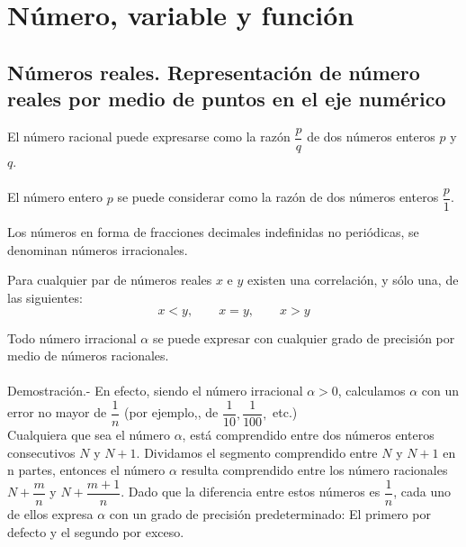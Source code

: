 \chapter{Número, variable y función}

\section{Números reales. Representación de número reales por medio de puntos en el eje numérico}

    \begin{tcolorbox}[colframe=white]
	\begin{def.}
	    El número racional puede expresarse como la razón $\dfrac{p}{q}$ de dos números enteros $p$ y $q$.\\\\
	    El número entero $p$ se puede considerar como la razón de dos números enteros $\dfrac{p}{1}$.\\
	\end{def.}
    \end{tcolorbox}
       
    \begin{tcolorbox}[colframe = white]
	\begin{def.}
	    Los números en forma de fracciones decimales indefinidas no periódicas, se denominan números irracionales.\\
	\end{def.}
    \end{tcolorbox}

    \begin{tcolorbox}[colframe=white]
	\begin{def.}
	    Para cualquier par de números reales $x$ e $y$ existen una correlación, y sólo una, de las siguientes:
	    $$x<y, \qquad x=y, \qquad x>y$$
	\end{def.}
    \end{tcolorbox}

	\begin{teo}
	    Todo número irracional $\alpha$ se puede expresar con cualquier grado de precisión por medio de números racionales.\\\\
	    Demostración.-\; En efecto, siendo el número irracional $\alpha>0$, calculamos $\alpha$ con un error no mayor de $\dfrac{1}{n}$ (por ejemplo,, de $\dfrac{1}{10}, \dfrac{1}{100},$ etc.)\\
	    Cualquiera que sea el número $\alpha$, está comprendido entre dos números enteros consecutivos $N$ y $N+1$. Dividamos el segmento comprendido entre $N$ y $N+1$ en n partes, entonces el número $\alpha$ resulta comprendido entre los número racionales $N + \dfrac{m}{n}$ y $N + \dfrac{m+1}{n}$. Dado que la diferencia entre estos números es $\dfrac{1}{n}$, cada uno de ellos expresa $\alpha$ con un grado de precisión predeterminado: El primero por defecto y el segundo por exceso.\\\\
	\end{teo}


